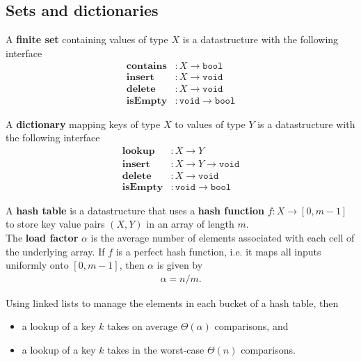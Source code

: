 \documentclass{article}
\begin{document}
\subsection{Sets and dictionaries}


\begin{definition}
	A \textbf{finite set} containing values of type $X$ is a datastructure with the following interface
	\begin{align*}
		\textbf{contains} &: X\to \texttt{bool}\\
		\textbf{insert} &: X \to \texttt{void}\\
		\textbf{delete} &: X \to \texttt{void}\\
		\textbf{isEmpty} &: \texttt{void} \to \texttt{bool}
	\end{align*}
\end{definition}
\begin{definition}
	A \textbf{dictionary} mapping keys of type $X$ to values of type $Y$
	is a datastructure with the following interface
	\begin{align*}
		\textbf{lookup} &: X \to Y\\
		\textbf{insert} &: X \to Y \to \texttt{void}\\
		\textbf{delete} &: X \to \texttt{void}\\
		\textbf{isEmpty} &: \texttt{void} \to \texttt{bool}
	\end{align*}
\end{definition}
\begin{definition}
	A \textbf{hash table} is a datastructure that uses a \textbf{hash function} $f: X \to [0,m-1]$
	to store key value pairs $(X,Y)$ in an array of length $m$.\\
	The \textbf{load factor} $\alpha$ is the average number of elements associated with each cell
	of the underlying array. If $f$ is a perfect hash function, i.e. it maps all inputs uniformly
	onto $[0,m-1]$, then $\alpha$ is given by 
	\begin{align*}
		\alpha = n / m.
	\end{align*}
\end{definition}
\begin{proposition}
	Using linked lists to manage the elements in each bucket of a hash table, then
	\begin{itemize}
		\item a lookup of a key $k$  takes on average $\Theta(\alpha)$ comparisons, and
		\item a lookup of a key $k$ takes in the worst-case $\Theta(n)$ comparisons.
	\end{itemize}
\end{proposition}
\end{document}

